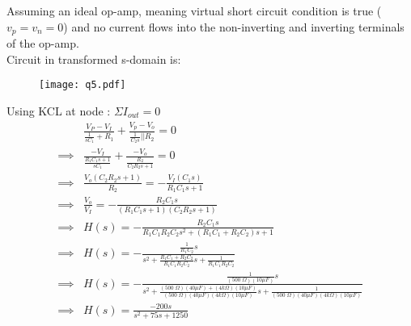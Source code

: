 
\def \Ri{500 \; \Omega}
\def \Rii{4  k\Omega}
\def \Ci{40 \mu F}
\def \Cii{10 \mu F}
Assuming an ideal op-amp, meaning virtual short circuit condition is true ($v_p = v_n = 0$) 
and no current flows into the non-inverting and inverting terminals of the op-amp.\\

Circuit in transformed s-domain is: \\

\begin{figure}[H]
\begin{center}
\texttt{[image: q5.pdf]}
\end{center}
\end{figure}

Using KCL at node : $\Sigma I_{out} = 0$
\begin{align*}
&\frac{V_P-V_I}{\frac{1}{sC_1} + R_1 } + \frac{V_p - V_o}{\frac{1}{C_2s}||R_2} = 0
\\
\implies & \frac{-V_I}{\frac{R_1C_1s + 1}{sC_1}} + \frac{- V_o}{\frac{R_2}{C_2R_2s + 1}} = 0
\\
\implies & \frac{V_o (C_2R_2s + 1)}{R_2} = -\frac{V_I(C_1s)}{R_1C_1s+1}
\\
\implies & \frac{V_o}{V_I} = - \frac{R_2C_1s}{(R_1C_1s+1)(C_2R_2s+1)}
\\
\implies & H(s) = - \frac{R_2C_1s}{R_1C_1R_2C_2s^2 + (R_1C_1 + R_2C_2)s + 1}
\\
\implies & H(s) = - \frac{\frac{1}{R_1C_2}s}{s^2 + \frac{R_1C_1 + R_2C_2}{R_1C_1R_2C_2}s + \frac{1}{R_1C_1R_2C_2}}
\\
\implies & H(s) = - \frac{\frac{1}{(\Ri)(\Cii)}s}{s^2 + 
\frac{(\Ri)(\Ci)+(\Rii)(\Cii)}{(\Ri)(\Ci)(\Rii)(\Cii)}s + \frac{1}{(\Ri)(\Ci)(\Rii)(\Cii)} }
\\
\implies &H(s) = \frac{-200s}{s^2 + 75s + 1250}
\end{align*}